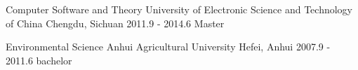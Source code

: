 

\begin{cventries}

  \cveduentry
    {Computer Software and Theory} %
    {University of Electronic Science and Technology of China} %
    {Chengdu, Sichuan} %
    {2011.9 - 2014.6} %
    {Master}

  \cveduentry
    {Environmental  Science} %
    {Anhui Agricultural University} %
    {Hefei, Anhui} %
    {2007.9 - 2011.6} %
    {bachelor}

\end{cventries}
